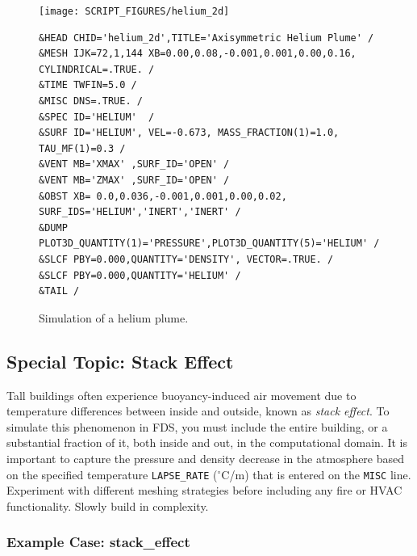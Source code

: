 \documentclass[11pt]{book}
\newcommand{\ct}{\tt\small}
\begin{document}
\begin{figure}[ht]
\scriptsize
\noindent
\begin{minipage}{1.1in}
\texttt{[image: SCRIPT\_FIGURES/helium\_2d]}
\end{minipage}
\hfill
\begin{minipage}{5.5in}
\begin{verbatim}
&HEAD CHID='helium_2d',TITLE='Axisymmetric Helium Plume' /
&MESH IJK=72,1,144 XB=0.00,0.08,-0.001,0.001,0.00,0.16, CYLINDRICAL=.TRUE. /
&TIME TWFIN=5.0 /
&MISC DNS=.TRUE. /
&SPEC ID='HELIUM'  /
&SURF ID='HELIUM', VEL=-0.673, MASS_FRACTION(1)=1.0, TAU_MF(1)=0.3 /
&VENT MB='XMAX' ,SURF_ID='OPEN' /
&VENT MB='ZMAX' ,SURF_ID='OPEN' /
&OBST XB= 0.0,0.036,-0.001,0.001,0.00,0.02, SURF_IDS='HELIUM','INERT','INERT' /
&DUMP PLOT3D_QUANTITY(1)='PRESSURE',PLOT3D_QUANTITY(5)='HELIUM' /
&SLCF PBY=0.000,QUANTITY='DENSITY', VECTOR=.TRUE. /
&SLCF PBY=0.000,QUANTITY='HELIUM' /
&TAIL /
\end{verbatim}
\end{minipage}
\normalsize
\caption[Axi-symmetric helium plume]{Simulation of a helium plume.}
\label{helium_plume}
\end{figure}







\subsection{Special Topic: Stack Effect}
\label{info:stackeffect}

Tall buildings often experience buoyancy-induced air movement due to temperature differences
between inside and outside, known as {\em stack effect}. To simulate this phenomenon in FDS, you must
include the entire building, or a substantial fraction of it, both inside and out, in the computational domain. It
is important to capture the pressure and density decrease in the atmosphere based on the specified
temperature {\ct LAPSE\_RATE} ($^\circ$C/m) that is entered on the {\ct MISC} line. Experiment with different meshing
strategies before including any fire or HVAC functionality. Slowly build in complexity.

\subsubsection{Example Case: stack\_effect}
\end{document}
